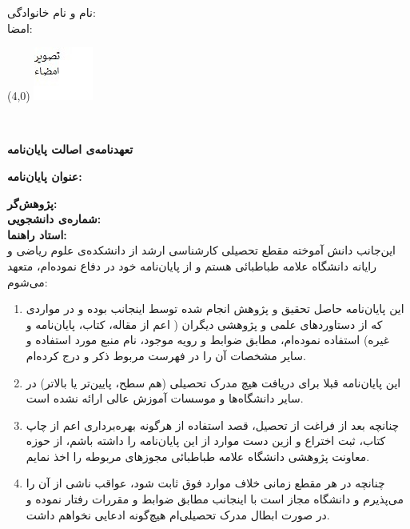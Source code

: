 \vspace{1cm}
\begin{center}
{ نام و نام خانوادگی:} \faAuthor \\ 
 \hspace{-1cm} امضا:\\
 

\begin{textblock}{3}(4,0)
\includegraphics[scale=2]{sign.jpg}
\end{textblock}
 
\vspace{1cm}
     \fadate
\end{center}
  \mbox{ }
%
\newpage
 \thispagestyle{empty}
\setlength{\baselineskip}{1.1\baselineskip}
\begin{center}
\textbf{
تعهدنامه‌ی اصالت پایان‌نامه}   

 \vspace{.8cm}

\textbf{ عنوان پایان‌نامه:}  \fatitle  \\  
\end{center}
\vspace{.5cm}
\textbf{ پژوهش‌گر:} \faAuthor \\  
 \textbf{شماره‌ی دانشجویی:} \stuno \\
\textbf{ استاد راهنما:} \fasupervisor  \vspace{.5cm}    \\  

این‌جانب \textbf{\faAuthor} دانش آموخته مقطع تحصیلی کارشناسی ارشد  \textbf{\famajor} از دانشکده‌ی علوم ریاضی و رایانه دانشگاه علامه طباطبائی هستم و از پایان‌نامه خود در \fadate دفاع نموده‌ام، متعهد می‌شوم:
\begin{enumerate}
\item
این پایان‌نامه حاصل تحقیق و پژوهش انجام شده توسط اینجانب بوده و در مواردی که از دستاوردهای علمی و پژوهشی دیگران ( اعم از مقاله، کتاب، پایان‌نامه و غیره) استفاده نموده‌ام، مطابق ضوابط و رویه موجود، نام منبع مورد استفاده و سایر مشخصات آن را در فهرست مربوط ذکر و درج کرده‌ام.
\item
این پایان‌نامه قبلا برای دریافت هیچ مدرک تحصیلی (هم سطح، پایین‌تر یا بالاتر) در سایر دانشگاه‌ها و موسسات آموزش عالی ارائه نشده است.
\item
چنانچه بعد از فراغت از تحصیل، قصد استفاده از هرگونه بهره‌برداری اعم از چاپ کتاب، ثبت اختراع و ازین دست موارد از این پایان‌نامه را داشته باشم، از حوزه معاونت پژوهشی دانشگاه علامه طباطبائی مجوزهای مربوطه را اخذ نمایم.
\item
چنانچه در هر مقطع زمانی خلاف موارد فوق ثابت شود، عواقب ناشی از آن را می‌پذیرم و دانشگاه مجاز است با اینجانب مطابق ضوابط و مقررات رفتار نموده و در صورت ابطال مدرک تحصیلی‌ام هیچ‌گونه ادعایی نخواهم داشت.
\end{enumerate}

